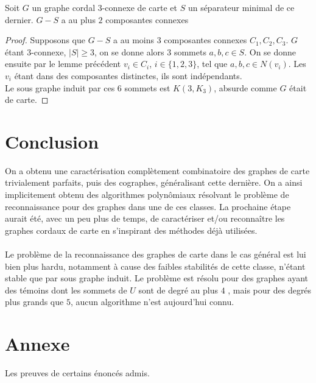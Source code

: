 \documentclass{scrartcl}
\begin{document}
\begin{flushleft}
\begin{cor}
    Soit $G$ un graphe cordal $3$-connexe de carte et $S$ un séparateur minimal de ce dernier. $G - S$ a au plus $2$ composantes
    connexes
\end{cor}

\begin{proof}
    Supposons que $G - S$ a au moins $3$ composantes connexes $C_1, C_2, C_3$. $G$ étant $3$-connexe, $|S| \geq 3$, on se donne
    alors $3$ sommets $a,b,c \in S$. On se donne ensuite par le lemme précédent $v_i \in C_i$, $i \in \{1,2,3\}$, tel que
    $a,b,c \in N(v_i)$. Les $v_i$ étant dans des composantes distinctes, ils sont indépendants.\\
    Le sous graphe induit par ces $6$ sommets est $K(3, K_3)$, absurde comme $G$ était de carte.
\end{proof}

\section*{Conclusion}

On a obtenu une caractérisation complètement combinatoire des graphes de carte trivialement parfaits, puis des cographes,
généralisant cette dernière. On a ainsi implicitement obtenu des algorithmes polynômiaux résolvant le problème de reconnaissance
pour des graphes dans une de ces classes. La prochaine étape aurait été, avec un peu plus de temps, de caractériser et/ou
reconnaître les graphes cordaux de carte en s'inspirant des méthodes déjà utilisées.
\\~\\
Le problème de la reconnaissance des graphes de carte dans le cas général est lui bien plus hardu, notamment à cause des faibles
stabilités de cette classe, n'étant stable que par sous graphe induit. Le problème est résolu pour des graphes ayant des témoins dont
les sommets de $U$ sont de degré au plus $4$ \cite{IntroMap},
mais pour des degrés plus grands que $5$, aucun algorithme n'est aujourd'hui connu.





\section*{Annexe}

Les preuves de certains énoncés admis.


\end{flushleft}
\end{document}
